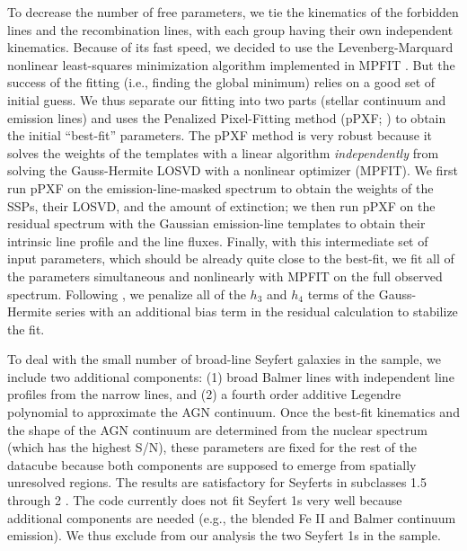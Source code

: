 \documentclass[iop,revtex4,twocolumn,apj,numberedappendix,appendixfloats]{emulateapj}
\begin{document}
To decrease the number of free parameters, we tie the kinematics of the forbidden lines and the recombination lines, with each group having their own independent kinematics. Because of its fast speed, we decided to use the Levenberg-Marquard nonlinear least-squares minimization algorithm \citep[][; chap. 15.5]{Press92} implemented in MPFIT \citep{Markwardt09}. But the success of the fitting (i.e., finding the global minimum) relies on a good set of initial guess. We thus separate our fitting into two parts (stellar continuum and emission lines) and uses the Penalized Pixel-Fitting method (pPXF; \citealt{Cappellari04}) to obtain the initial ``best-fit'' parameters. The pPXF method is very robust because it solves the weights of the templates with a linear algorithm \citep[BVLS;][]{Lawson74} {\it independently} from solving the Gauss-Hermite LOSVD with a nonlinear optimizer (MPFIT). We first run pPXF on the emission-line-masked spectrum to obtain the weights of the SSPs, their LOSVD, and the amount of extinction; we then run pPXF on the residual spectrum with the Gaussian emission-line templates to obtain their intrinsic line profile and the line fluxes. Finally, with this intermediate set of input parameters, which should be already quite close to the best-fit, we fit all of the parameters simultaneous and nonlinearly with MPFIT on the full observed spectrum. Following \citet{Cappellari04}, we penalize all of the $h_3$ and $h_4$ terms of the Gauss-Hermite series with an additional bias term in the residual calculation to stabilize the fit.

To deal with the small number of broad-line Seyfert galaxies in the sample, we include two additional components: (1) broad Balmer lines with independent line profiles from the narrow lines, and (2) a fourth order additive Legendre polynomial to approximate the AGN continuum. Once the best-fit kinematics and the shape of the AGN continuum are determined from the nuclear spectrum (which has the highest S/N), these parameters are fixed for the rest of the datacube because both components are supposed to emerge from spatially unresolved regions. The results are satisfactory for Seyferts in subclasses 1.5 through 2 \citep{Osterbrock81}. The code currently does not fit Seyfert 1s very well because additional components are needed (e.g., the blended Fe {\sc II} and Balmer continuum emission). We thus exclude from our analysis the two Seyfert 1s in the sample. %
\end{document}
